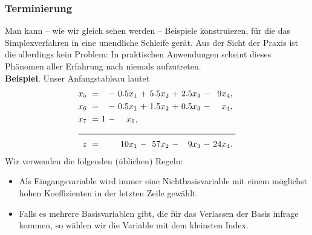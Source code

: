 \documentclass[smaller]{beamer}
\begin{document}
\begin{frame}
 \frametitle{Terminierung}
 Man kann -- wie wir gleich sehen werden -- Beispiele konstruieren, für die das Simplexverfahren in eine \alert{unendliche Schleife} gerät. Aus der Sicht der Praxis ist die allerdings kein Problem: In praktischen Anwendungen scheint dieses Phänomen aller Erfahrung nach niemals aufzutreten.\\
 \vspace*{0.2cm}
\textbf{Beispiel}. Unser Anfangstableau lautet
\begin{align*}
\begin{alignedat}{6}
x_5 &\ = &\     &\ - &\ 0.5x_1 &\ + &\ 5.5x_2 &\ + &\ 2.5x_3 &\ - &\  9x_4,\ \\
x_6 &\ = &\     &\ - &\ 0.5x_1 &\ + &\ 1.5x_2 &\ + &\ 0.5x_3 &\ - &\   x_4,\ \\
x_7 &\ = &\   1 &\ - &\    x_1, &\   &\        &\   &\        &\   &\        \\ \cline{1-11}
z   &\ = &\     &\   &\  10x_1 &\ - &\  57x_2 &\ - &\   9x_3 &\ - &\ 24x_4.\
\end{alignedat}
\end{align*}
Wir verwenden die folgenden (üblichen) \alert{Regeln}:
\begin{itemize}
\item Als Eingangsvariable wird immer eine Nichtbasisvariable mit einem möglichst hohen Koeffizienten in der letzten Zeile gewählt.
\item Falls es mehrere Basisvariablen gibt, die für das Verlassen der Basis infrage kommen, so wählen wir die Variable mit dem kleinsten Index.
\end{itemize}
\end{frame}
\end{document}
